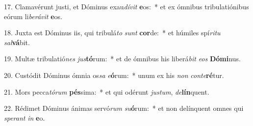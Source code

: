 17. Clamavérunt justi, et Dóminus exau\textit{dí}\textit{vit} \textbf{e}os:~*  et ex ómnibus tribulatiónibus eórum li\textit{be}\textit{rá}\textit{vit} \textbf{e}os.\

18. Juxta est Dóminus iis, qui tribulá\textit{to} \textit{sunt} \textbf{cor}de:~*  et húmiles spí\textit{ri}\textit{tu} \textit{sal}\textbf{vá}bit.\

19. Multæ tribulatió\textit{nes} \textit{jus}\textbf{tó}rum:~*  et de ómnibus his liberá\textit{bit} \textit{e}\textit{os} \textbf{Dó}\textbf{mi}nus.\

20. Custódit Dóminus ómnia os\textit{sa} \textit{e}\textbf{ó}rum:~*  unum ex his \textit{non} \textit{con}\textit{te}\textbf{ré}tur.\

21. Mors pecca\textit{tó}\textit{rum} \textbf{pés}sima:~*  et qui odérunt \textit{jus}\textit{tum}, \textit{de}\textbf{lín}quent.\

22. Rédimet Dóminus ánimas servó\textit{rum} \textit{su}\textbf{ó}rum:~*  et non delínquent omnes qui \textit{spe}\textit{rant} \textit{in} \textbf{e}o.\

